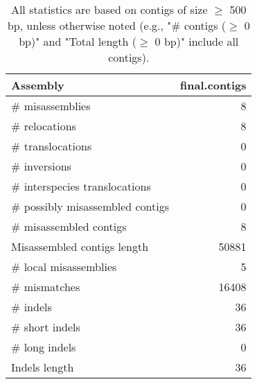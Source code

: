 \documentclass[12pt,a4paper]{article}
\begin{document}
\begin{table}[ht]
\begin{center}
\caption{All statistics are based on contigs of size $\geq$ 500 bp, unless otherwise noted (e.g., "\# contigs ($\geq$ 0 bp)" and "Total length ($\geq$ 0 bp)" include all contigs).}
\begin{tabular}{|l*{1}{|r}|}
\hline
Assembly & final.contigs \\ \hline
\# misassemblies & 8 \\ \hline
\hspace{5mm}\# relocations & 8 \\ \hline
\hspace{5mm}\# translocations & 0 \\ \hline
\hspace{5mm}\# inversions & 0 \\ \hline
\hspace{5mm}\# interspecies translocations & 0 \\ \hline
\# possibly misassembled contigs & 0 \\ \hline
\# misassembled contigs & 8 \\ \hline
Misassembled contigs length & 50881 \\ \hline
\# local misassemblies & 5 \\ \hline
\# mismatches & 16408 \\ \hline
\# indels & 36 \\ \hline
\hspace{5mm}\# short indels & 36 \\ \hline
\hspace{5mm}\# long indels & 0 \\ \hline
Indels length & 36 \\ \hline
\end{tabular}
\end{center}
\end{table}
\end{document}
